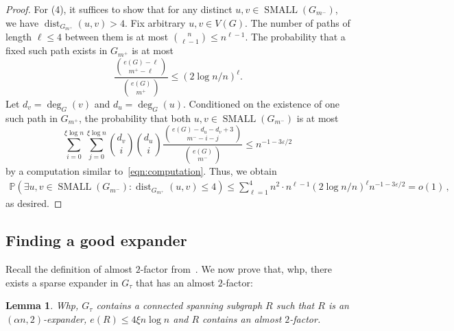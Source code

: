 \documentclass[reqno,final,a4paper]{amsart}
\numberwithin{equation}{section}
\newtheorem{lemma}[theorem]{Lemma}
\theoremstyle{definition}
\theoremstyle{remark}
\renewcommand{\Pr}{\mathbb{P}}
\newcommand{\eps}{\varepsilon}
\newcommand{\SMA}{\operatorname{SMALL}}
\newcommand{\dist}{\operatorname{dist}}
\begin{document}
\begin{proof}
    For (4), it suffices to show that for any distinct $u,v\in \SMA(G_{m^-})$, we have $\dist_{G_{m^+}}(u,v)>4$. Fix arbitrary $u,v\in V(G)$. The number of paths of length $\ell \leq 4$ between them is at most $\binom{n}{\ell-1}\leq n^{\ell-1}$. The probability that a fixed such path exists in $G_{m^+}$ is at most 
    \[
        \frac{\binom{e(G)-\ell}{m^+ -\ell}}{\binom{e(G)}{m^+}} \leq (2\log n/n)^\ell.
    \]
    Let $d_v = \deg_G(v)$ and $d_u = \deg_G(u)$. 
    Conditioned on the existence of one such path in $G_{m^+}$, the probability that both $u,v\in \SMA(G_{m^-})$ is at most 
    \[
        \sum_{i=0}^{\xi\log n}\sum_{j=0}^{\xi\log n} \binom{d_v}{i}\binom{d_u}{i} \frac{\binom{e(G)-d_u-d_v+3}{m^- - i-j}}{\binom{e(G)}{m^-}}\leq n^{-1-3\eps/2}\,
    \]
    by a computation similar to~\eqref{eqn:computation}.
    Thus, we obtain
    \begin{align*}
            \Pr(\exists u,v\in \SMA(G_{m^-}): \dist_{G_{m^+}}(u,v)\leq 4)\leq \sum_{\ell=1}^4 n^2\cdot n^{\ell-1} (2\log n/n)^{\ell}n^{-1-3\eps/2} = o(1)\,,
        \end{align*}
     as desired.
    \end{proof}

\subsection{Finding a good expander}
Recall the definition of almost $2$-factor from~.
We now prove that, whp, there exists a sparse expander in $G_\tau$ that has an almost $2$-factor:
\begin{lemma}\label{lem:sparse-expander-almost-2factor-exists}
    Whp, $G_\tau$ contains a connected spanning subgraph $R$ such that $R$ is an $(\alpha n,2)$-expander, $e(R)\leq 4\xi n \log n$ and $R$ contains an almost $2$-factor.
\end{lemma}
\end{document}
